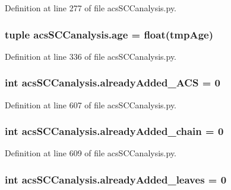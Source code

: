 Definition at line 277 of file acs\-S\-C\-Canalysis.\-py.

\hypertarget{a00097_a98baad82b74a27e8b8c58aa985b7d374}{
\subsubsection[{age}]{\setlength{\rightskip}{0pt plus 5cm}tuple acs\-S\-C\-Canalysis.\-age = float(tmp\-Age)}}\label{a00097_a98baad82b74a27e8b8c58aa985b7d374}


Definition at line 336 of file acs\-S\-C\-Canalysis.\-py.

\hypertarget{a00097_a38f20e6b1cad6a61f1c9b87b37c76f63}{
\subsubsection[{already\-Added\-\_\-\-A\-C\-S}]{\setlength{\rightskip}{0pt plus 5cm}int acs\-S\-C\-Canalysis.\-already\-Added\-\_\-\-A\-C\-S = 0}}\label{a00097_a38f20e6b1cad6a61f1c9b87b37c76f63}


Definition at line 607 of file acs\-S\-C\-Canalysis.\-py.

\hypertarget{a00097_ac1b286545469555eb284f9b5f2bd984f}{
\subsubsection[{already\-Added\-\_\-chain}]{\setlength{\rightskip}{0pt plus 5cm}int acs\-S\-C\-Canalysis.\-already\-Added\-\_\-chain = 0}}\label{a00097_ac1b286545469555eb284f9b5f2bd984f}


Definition at line 609 of file acs\-S\-C\-Canalysis.\-py.

\hypertarget{a00097_ac842390795cf193351c795945cde8e77}{
\subsubsection[{already\-Added\-\_\-leaves}]{\setlength{\rightskip}{0pt plus 5cm}int acs\-S\-C\-Canalysis.\-already\-Added\-\_\-leaves = 0}}\label{a00097_ac842390795cf193351c795945cde8e77}


